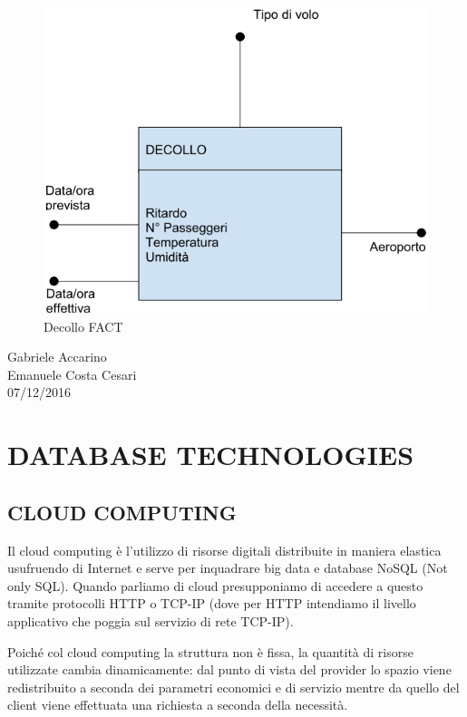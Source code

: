 \begin{center}
\begin{figure}[H]
\centering
\includegraphics[scale=1]{figures/decollo.png}
\caption{Decollo FACT}
\end{figure}
\end{center}



\begin{flushright}Gabriele Accarino\\Emanuele Costa Cesari\\07/12/2016\end{flushright}


\section{DATABASE TECHNOLOGIES}


\subsection{CLOUD COMPUTING}

Il cloud computing è l’utilizzo di risorse digitali distribuite in maniera elastica usufruendo di Internet e serve per inquadrare big data e database NoSQL (Not only SQL). Quando parliamo di cloud presupponiamo di accedere a questo tramite protocolli HTTP o TCP-IP (dove per HTTP intendiamo il livello applicativo che poggia sul servizio di rete TCP-IP).  

Poiché col cloud computing la struttura non è fissa, la quantità di risorse utilizzate cambia dinamicamente: dal punto di vista del provider lo spazio viene redistribuito a seconda dei parametri economici e di servizio mentre da quello del client viene effettuata una richiesta a seconda della necessità. 

